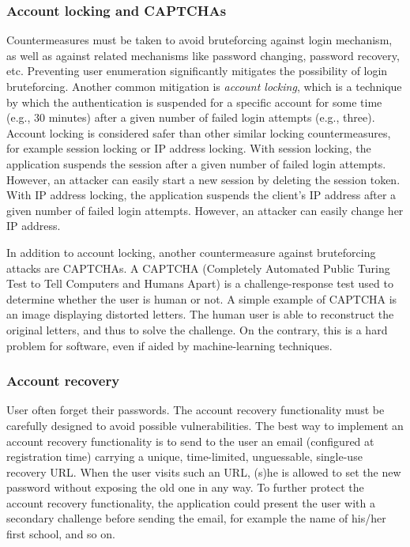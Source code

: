 \documentclass[a4paper,12pt]{article}
\begin{document}
\subsubsection{Account locking and CAPTCHAs}
Countermeasures must be taken to avoid bruteforcing against login mechanism, as well as against related mechanisms like password changing, password recovery, etc. Preventing user enumeration significantly mitigates the possibility of login bruteforcing. Another common mitigation is \textit{account locking}, which is a technique by which the authentication is suspended for a specific account for some time (e.g., 30 minutes) after a given number of failed login attempts (e.g., three). Account locking is considered safer than other similar locking countermeasures, for example session locking or IP address locking. With session locking, the application suspends the session after a given number of failed login attempts. However, an attacker can easily start a new session by deleting the session token. With IP address locking, the application suspends the client’s IP address after a given number of failed login attempts. However, an attacker can easily change her IP address.

In addition to account locking, another countermeasure against bruteforcing attacks are CAPTCHAs. A CAPTCHA (Completely Automated Public Turing Test to Tell Computers and Humans Apart) is a challenge-response test used to determine whether the user is human or not. A simple example of CAPTCHA is an image displaying distorted letters. The human user is able to reconstruct the original letters, and thus to solve the challenge. On the contrary, this is a hard problem for software, even if aided by machine-learning techniques.

\subsubsection{Account recovery}
User often forget their passwords. The account recovery functionality must be carefully designed to avoid possible vulnerabilities. The best way to implement an account recovery functionality is to send to the user an email (configured at registration time) carrying a unique, time-limited, unguessable, single-use recovery URL. When the user visits such an URL, (s)he is allowed to set the new password without exposing the old one in any way. To further protect the account recovery functionality, the application could present the user with a secondary challenge before sending the email, for example the name of his/her first school, and so on.
\end{document}

